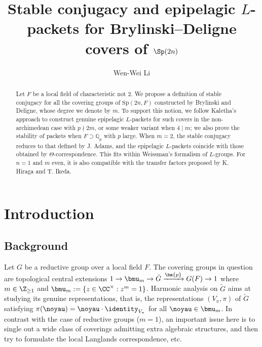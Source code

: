 \documentclass[a4paper,10pt]{article}
\title{Stable conjugacy and epipelagic $L$-packets for Brylinski--Deligne covers of $\Sp(2n)$}
\author{Wen-Wei Li}
\date{}
\begin{document}
\maketitle

\begin{abstract}
	Let $F$ be a local field of characteristic not $2$. We propose a definition of stable conjugacy for all the covering groups of $\mathrm{Sp}(2n,F)$ constructed by Brylinski and Deligne, whose degree we denote by $m$. To support this notion, we follow Kaletha's approach to construct genuine epipelagic $L$-packets for such covers in the non-archimedean case with $p \nmid 2m$, or some weaker variant when $4 \mid m$; we also prove the stability of packets when $F \supset \mathbb{Q}_p$ with $p$ large. When $m=2$, the stable conjugacy reduces to that defined by J.\! Adams, and the epipelagic $L$-packets coincide with those obtained by $\Theta$-correspondence. This fits within Weissman's formalism of $L$-groups. For $n=1$ and $m$ even, it is also compatible with the transfer factors proposed by K.\! Hiraga and T.\! Ikeda.
\end{abstract}


\tableofcontents

\section{Introduction}
\subsection*{Background}
Let $G$ be a reductive group over a local field $F$. The covering groups in question are topological central extensions $1 \to \bmu_m \to \tilde{G} \xrightarrow{\bm{p}} G(F) \to 1$ where $m \in \Z_{\geq 1}$ and $\bmu_m := \{z \in \CC^\times: z^m=1 \}$. Harmonic analysis on $\tilde{G}$ aims at studying its genuine representations, that is, the representations $(V_\pi, \pi)$ of $\tilde{G}$ satisfying $\pi(\noyau) = \noyau \cdot \identity_{V_\pi}$ for all $\noyau \in \bmu_m$. In contrast with the case of reductive groups ($m=1$), an important issue here is to single out a wide class of coverings admitting extra algebraic structures, and then try to formulate the local Langlands correspondence, etc.
\end{document}
